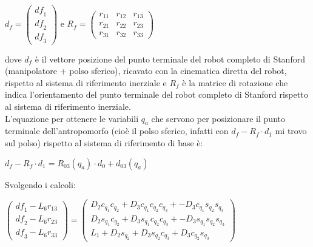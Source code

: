 \documentclass[a4paper,12pt]{article}
\begin{document}
\begin{center}
$d_f=\begin{pmatrix}{{\mathit{df}}_1}\\
{{\mathit{df}}_2}\\
{{\mathit{df}}_3}\end{pmatrix}$ e $R_f=\begin{pmatrix}{r_{11}} & {r_{12}} & {r_{13}}\\
{r_{21}} & {r_{22}} & {r_{23}}\\
{r_{31}} & {r_{32}} & {r_{33}}\end{pmatrix}$
\end{center}

\begin{flushleft}
dove $d_f$ è il vettore posizione del punto terminale del robot completo di Stanford (manipolatore + polso sferico), ricavato con la cinematica diretta del robot, rispetto al sistema di riferimento inerziale e $R_f$ è la matrice di rotazione che indica l'orientamento del punto terminale del robot completo di Stanford rispetto al sistema di riferimento inerziale. \\
L'equazione per ottenere le variabili $q_a$ che servono per posizionare il punto terminale dell'antropomorfo (cioè il polso sferico, infatti con $d_f- R_f \cdot d_1$ mi trovo sul polso) rispetto al sistema di riferimento di base è:
\end{flushleft}

\begin{center}
$d_f- R_f \cdot d_1 = R_{03}(q_a) \cdot d_0 + d_{03}(q_a)$ 
\end{center}

Svolgendo i calcoli:

\begin{center}
$\begin{pmatrix}{{\mathit{df}}_1}-{L_6} {r_{13}}\\
{{\mathit{df}}_2}-{L_6} {r_{23}}\\
{{\mathit{df}}_3}-{L_6} {r_{33}}\end{pmatrix}=\begin{pmatrix}{D_2} {c_{{q_1}}} {c_{{q_2}}}+{D_3} {c_{{q_1}}} {c_{{q_2}}} {c_{{q_3}}}+-{D_3} {c_{{q_1}}} {s_{{q_2}}} {s_{{q_3}}}\\
{D_2} {s_{{q_1}}} {c_{{q_2}}}+{D_3} {s_{{q_1}}} {c_{{q_2}}} {c_{{q_3}}}+-{D_3} {s_{{q_1}}} {s_{{q_2}}} {s_{{q_3}}}\\
{L_1}+{D_2} {s_{{q_2}}}+{D_3} {s_{{q_2}}} {c_{{q_3}}}+{D_3} {c_{{q_2}}} {s_{{q_3}}}\end{pmatrix}$
\end{center}
\end{document}
